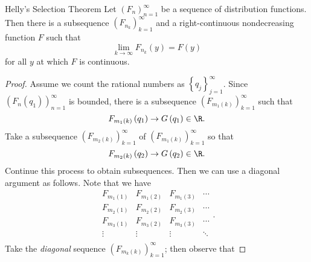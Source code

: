 \documentclass[stat901]{subfiles}
\begin{document}
    \rruleline

    \begin{theorem}{Helly's Selection Theorem}
        Let $\left( F_{n} \right)^{\infty}_{n=1}$ be a sequence of distribution functions. Then there is a subsequence $\left( F_{n_k} \right)^{\infty}_{k=1}$ and a right-continuous nondecreasing function $F$ such that
        \begin{equation*}
            \lim_{k\to\infty} F_{n_k}\left( y \right) = F\left( y \right)
        \end{equation*}
        for all $y$ at which $F$ is continuous.
    \end{theorem}

    \begin{proof}
        Assume we count the rational numbers as $\left\lbrace q_j \right\rbrace^{\infty}_{j=1}$. Since $\left( F_{n}\left( q_1 \right) \right)^{\infty}_{n=1}$ is bounded, there is a subsequence $\left( F_{m_1\left( k \right)} \right)^{\infty}_{k=1}$ such that
        \begin{equation*}
            F_{m_1\left( k \right)}\left( q_1 \right) \to G\left( q_1 \right)\in\R.
        \end{equation*}
        Take a subsequence $\left( F_{m_2\left( k \right)} \right)^{\infty}_{k=1}$ of $\left( F_{m_1\left( k \right)} \right)^{\infty}_{k=1}$ so that
        \begin{equation*}
            F_{m_2\left( k \right)}\left( q_2 \right)\to G\left( q_2 \right)\in\R.
        \end{equation*}
        Continue this process to obtain subsequences. Then we can use a diagonal argument as follows. Note that we have
        \begin{equation*}
            \begin{matrix}
                F_{m_1\left( 1 \right)} & F_{m_1\left( 2 \right)} & F_{m_1\left( 3 \right)} & \cdots \\
                F_{m_2\left( 1 \right)} & F_{m_2\left( 2 \right)} & F_{m_2\left( 3 \right)} & \cdots \\
                F_{m_3\left( 1 \right)} & F_{m_3\left( 2 \right)} & F_{m_3\left( 3 \right)} & \cdots \\
            	\vdots & \vdots & \vdots & \ddots \\
            \end{matrix}.
        \end{equation*}
        Take the \textit{diagonal} sequence $\left( F_{m_k\left( k \right)} \right)^{\infty}_{k=1}$; then observe that

\end{proof}
\end{document}
